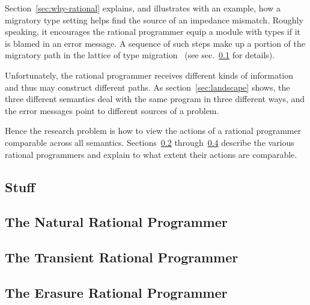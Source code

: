 
Section~\ref{sec:why-rational} explains, and illustrates with an example, how a
migratory type setting helps find the source of an impedance mismatch. Roughly
speaking, it encourages the rational programmer equip a module with types if it
is blamed in an error message. A sequence of such steps make up a portion of the
migratory path in the lattice of type migration~\cite{tfgnvf-popl-2016} (see
sec.~\ref{sub:stuff} for details). 

Unfortunately, the rational programmer receives different kinds of information
and thus may construct different paths. As section~\ref{sec:landscape} shows,
the three different semantics deal with the same program in three different
ways, and the error messages point to different sources of a problem.

Hence the research problem is how to view the actions of a rational programmer
comparable across all semantics. Sections~\ref{sub:natural}
through~\ref{sub:erasure} describe the various rational programmers and explain
to what extent their actions are comparable.

\def\rsub#1#2{\subsection{#2} \label{sub:#1} }

\rsub{stuff}     {Stuff} 

\rsub{natural}   {The Natural Rational Programmer} 
\rsub{transient} {The Transient Rational Programmer} 
\rsub{erasure}   {The Erasure Rational Programmer} 
